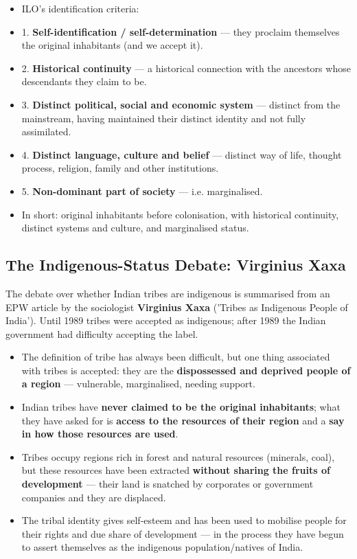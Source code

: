 \begin{KeyConcept}
\begin{itemize}
\item ILO's identification criteria:
\item 1. \textbf{Self-identification / self-determination} --- they proclaim themselves the original inhabitants (and we accept it).
\item 2. \textbf{Historical continuity} --- a historical connection with the ancestors whose descendants they claim to be.
\item 3. \textbf{Distinct political, social and economic system} --- distinct from the mainstream, having maintained their distinct identity and not fully assimilated.
\item 4. \textbf{Distinct language, culture and belief} --- distinct way of life, thought process, religion, family and other institutions.
\item 5. \textbf{Non-dominant part of society} --- i.e. marginalised.
\item In short: original inhabitants before colonisation, with historical continuity, distinct systems and culture, and marginalised status.
\end{itemize}
\end{KeyConcept}

\subsection{The Indigenous-Status Debate: Virginius Xaxa}

The debate over whether Indian tribes are indigenous is summarised from an EPW article by the sociologist \textbf{Virginius Xaxa} ('Tribes as Indigenous People of India'). Until 1989 tribes were accepted as indigenous; after 1989 the Indian government had difficulty accepting the label.

\begin{KeyConcept}
\begin{itemize}
\item The definition of tribe has always been difficult, but one thing associated with tribes is accepted: they are the \textbf{dispossessed and deprived people of a region} --- vulnerable, marginalised, needing support.
\item Indian tribes have \textbf{never claimed to be the original inhabitants}; what they have asked for is \textbf{access to the resources of their region} and a \textbf{say in how those resources are used}.
\item Tribes occupy regions rich in forest and natural resources (minerals, coal), but these resources have been extracted \textbf{without sharing the fruits of development} --- their land is snatched by corporates or government companies and they are displaced.
\item The tribal identity gives self-esteem and has been used to mobilise people for their rights and due share of development --- in the process they have begun to assert themselves as the indigenous population/natives of India.
\end{itemize}
\end{KeyConcept}

